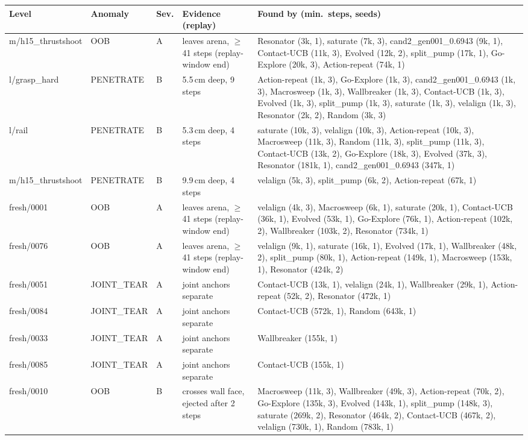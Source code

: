 \begin{table}[t]\centering\small
\begin{tabular}{llllp{5.6cm}}
\toprule
Level & Anomaly & Sev. & Evidence (replay) & Found by (min.\ steps, seeds) \\
\midrule
m/h15\_thrustshoot & OOB & A & leaves arena, $\ge$41 steps (replay-window end) & Resonator (3k, 1), saturate (7k, 3), cand2\_gen001\_0.6943 (9k, 1), Contact-UCB (11k, 3), Evolved (12k, 2), split\_pump (17k, 1), Go-Explore (20k, 3), Action-repeat (74k, 1) \\
l/grasp\_hard & PENETRATE & B & 5.5\,cm deep, 9 steps & Action-repeat (1k, 3), Go-Explore (1k, 3), cand2\_gen001\_0.6943 (1k, 3), Macrosweep (1k, 3), Wallbreaker (1k, 3), Contact-UCB (1k, 3), Evolved (1k, 3), split\_pump (1k, 3), saturate (1k, 3), velalign (1k, 3), Resonator (2k, 2), Random (3k, 3) \\
l/rail & PENETRATE & B & 5.3\,cm deep, 4 steps & saturate (10k, 3), velalign (10k, 3), Action-repeat (10k, 3), Macrosweep (11k, 3), Random (11k, 3), split\_pump (11k, 3), Contact-UCB (13k, 2), Go-Explore (18k, 3), Evolved (37k, 3), Resonator (181k, 1), cand2\_gen001\_0.6943 (347k, 1) \\
m/h15\_thrustshoot & PENETRATE & B & 9.9\,cm deep, 4 steps & velalign (5k, 3), split\_pump (6k, 2), Action-repeat (67k, 1) \\
fresh/0001 & OOB & A & leaves arena, $\ge$41 steps (replay-window end) & velalign (4k, 3), Macrosweep (6k, 1), saturate (20k, 1), Contact-UCB (36k, 1), Evolved (53k, 1), Go-Explore (76k, 1), Action-repeat (102k, 2), Wallbreaker (103k, 2), Resonator (734k, 1) \\
fresh/0076 & OOB & A & leaves arena, $\ge$41 steps (replay-window end) & velalign (9k, 1), saturate (16k, 1), Evolved (17k, 1), Wallbreaker (48k, 2), split\_pump (80k, 1), Action-repeat (149k, 1), Macrosweep (153k, 1), Resonator (424k, 2) \\
fresh/0051 & JOINT\_TEAR & A & joint anchors separate & Contact-UCB (13k, 1), velalign (24k, 1), Wallbreaker (29k, 1), Action-repeat (52k, 2), Resonator (472k, 1) \\
fresh/0084 & JOINT\_TEAR & A & joint anchors separate & Contact-UCB (572k, 1), Random (643k, 1) \\
fresh/0033 & JOINT\_TEAR & A & joint anchors separate & Wallbreaker (155k, 1) \\
fresh/0085 & JOINT\_TEAR & A & joint anchors separate & Contact-UCB (155k, 1) \\
fresh/0010 & OOB & B & crosses wall face, ejected after 2 steps & Macrosweep (11k, 3), Wallbreaker (49k, 3), Action-repeat (70k, 2), Go-Explore (135k, 3), Evolved (143k, 1), split\_pump (148k, 3), saturate (269k, 2), Resonator (464k, 2), Contact-UCB (467k, 2), velalign (730k, 1), Random (783k, 1) \\

\end{tabular}
\end{table}
